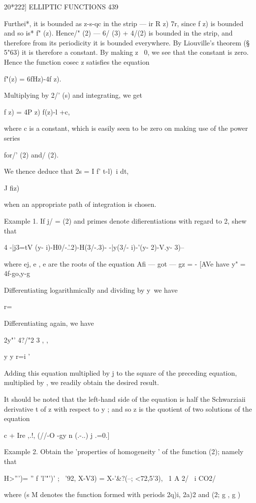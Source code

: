 {20*222] ELLIPTIC FUNCTIONS 439 

Furthei*, it is bounded as z-s-qc in the strip — ir R z) 7r, since f z) is bounded 
and so is* f" (z). Hence/" (2) — 6/  (3) + 4/(2) is bounded in the strip, and therefore from 
its periodicity it is bounded everywhere. By Liouville's theorem (§ 5"63) it is therefore 
a constant. By making z ~0, we see that the constant is zero. Hence the function 
cosec  z satisfies the equation 

f"(z) = 6fHz)-4f z). 

Multiplying by 2/' (s) and integrating, we get 

f z) = 4P z) f(z)-l +c, 

where c is a constant, which is easily seen to be zero on making use of the power series 

for/' (2) and/ (2). 

We thence deduce that 2s = I f'   t-l)~i dt, 

J fiz) 

when an appropriate path of integration is chosen. 

Example 1. If j/ =   (2) and primes denote difierentiations with regard to 2, shew that 

4 -|j3=tV (y- i)-H0/-.'.2)-H(3/-.3)-  -|y(3/- i)-'(y- 2)-V.y- 3)--\ 

where ej, e , e  are the roots of the equation Afi — got — gz =  - 
[AVe have y"  = 4f-go,y-g  

Differentiating logarithmically and dividing by y\ we have 

r=\ 

Differentiating again, we have 

2y"' 4?/"2 3 , ,   

y  y  r=i ' 

Adding this equation multiplied by j to the square of the preceding equation, 
multiplied by  , we readily obtain the desired result. 

It should be noted that the left-hand side of the equation is half the Schwarziaii 
derivative t of z with respect to y ; and so z is the quotient of two solutions of the 
equation 

c + Ire ,.!, (//-O -gy n (.-..) j .=0.] 

Example 2. Obtain the 'properties of homogeneity ' of the function  (2); namely that 

 H>''')= '' f 'l'"')'   ;  ~'92, X-V3) = X-'\&?(--; <72,5'3), 
\ 1 A 2/ \ i CO2/ 

where  (s M denotes the function formed with periods 2q)i, 2a)2 and  (2; g , g ) 

}
